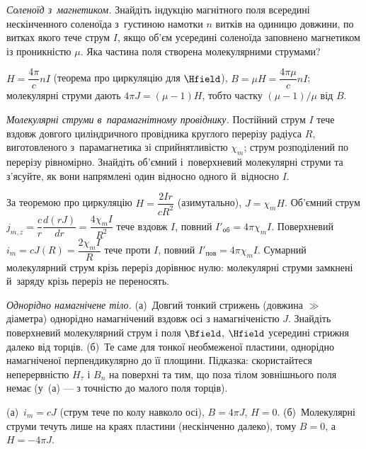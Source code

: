 
\begin{problem}\label{prb:SolenoidParamagnet}
	\emph{Соленоїд з~магнетиком.} Знайдіть індукцію магнітного поля всередині нескінченного соленоїда з~густиною намотки $n$ витків на
	одиницю довжини, по витках якого тече струм $I$, якщо об'єм усередині соленоїда заповнено магнетиком із проникністю $\mu$. Яка частина
	поля створена молекулярними струмами?
	\begin{solution}
		$H=\dfrac{4\pi}{c}nI$ (теорема про циркуляцію для $\Hfield$), $B=\mu H=\dfrac{4\pi\mu}{c}nI$; молекулярні струми дають
		$4\pi J=(\mu-1)H$, тобто частку $(\mu-1)/\mu$ від $B$.
	\end{solution}
\end{problem}

\begin{problem}\label{prb:ParamagneticWire}
	\emph{Молекулярні струми в~парамагнітному провіднику.} Постійний струм $I$ тече вздовж довгого циліндричного провідника круглого
	перерізу радіуса $R$, виготовленого з~парамагнетика зі сприйнятливістю $\chi_m$; струм розподілений по перерізу рівномірно. Знайдіть
	об'ємний і~поверхневий молекулярні струми та з'ясуйте, як вони напрямлені один відносно одного й~відносно $I$.
	\begin{solution}
		За теоремою про циркуляцію $H=\dfrac{2Ir}{cR^2}$ (азимутально), $J=\chi_mH$. Об'ємний струм
		$j_{m,z}=\dfrac{c}{r}\dfrac{d(rJ)}{dr}=\dfrac{4\chi_mI}{R^2}$ тече вздовж $I$, повний $I'_\text{об}=4\pi\chi_mI$. Поверхневий
		$i_m=cJ(R)=\dfrac{2\chi_mI}{R}$ тече проти $I$, повний $I'_\text{пов}=4\pi\chi_mI$. Сумарний молекулярний струм крізь переріз дорівнює
		нулю: молекулярні струми замкнені й~заряду крізь переріз не переносять.
	\end{solution}
\end{problem}

\begin{problem}\label{prb:MagnetizedNeedlePlate}
	\emph{Однорідно намагнічене тіло.} (а)~Довгий тонкий стрижень (довжина $\gg$ діаметра) однорідно намагнічений вздовж осі з намагніченістю $J$. Знайдіть поверхневий молекулярний струм і поля $\Bfield$, $\Hfield$ усередині стрижня далеко від торців. (б)~Те саме для тонкої необмеженої пластини, однорідно намагніченої перпендикулярно до її площини. Підказка: скористайтеся неперервністю $H_\tau$ і $B_n$ на поверхні та тим, що поза тілом зовнішнього поля немає (у~(а) --- з точністю до малого поля торців).
	\begin{solution}
		(а)~$i_m=cJ$ (струм тече по колу навколо осі), $B=4\pi J$, $H=0$. (б)~Молекулярні струми течуть лише на краях пластини (нескінченно далеко), тому $B=0$, а $H=-4\pi J$.
	\end{solution}
\end{problem}

